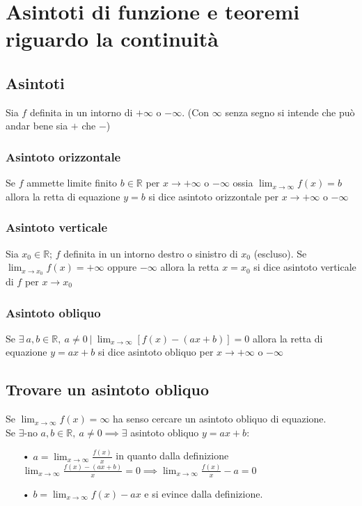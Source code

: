 \chapter{Asintoti di funzione e teoremi riguardo la continuità}
\section{Asintoti}
Sia $f$ definita in un intorno di $+\infty$ o $-\infty$. (Con $\infty$ senza segno si intende che può andar bene sia $+$ che $-$)
\subsection{Asintoto orizzontale}
Se $f$ ammette limite finito $b \in \mathbb{R}$ per $x \to +\infty$ o $-\infty$ ossia $\displaystyle \lim_{x \to \infty}f(x) = b$ allora la retta di equazione $y = b$ si dice asintoto orizzontale per $x \to +\infty$ o $-\infty$
\subsection{Asintoto verticale}
Sia $x_0 \in \mathbb{R}$; $f$ definita in un intorno destro o sinistro di $x_0$ (escluso). Se $\displaystyle \lim_{x \to x_0}f(x) = +\infty$ oppure $-\infty$ allora la retta $x = x_0$ si dice asintoto verticale di $f$ per $x \to x_0$
\subsection{Asintoto obliquo}
Se $\exists\ a,b \in \mathbb{R},\ a \neq 0\ |\ \displaystyle \lim_{x \to \infty}[f(x) - (ax + b)] = 0$ allora la retta di equazione $y = ax + b$ si dice asintoto obliquo per $x \to +\infty$ o $-\infty$

\section{Trovare un asintoto obliquo}
Se $\displaystyle \lim_{x \to \infty}f(x) = \infty$ ha senso cercare un asintoto obliquo di equazione.\\
Se $\exists \text{-no } a,b \in \mathbb{R},\ a \neq 0 \implies \exists$ asintoto obliquo $y = ax + b$:
\begin{enumerate}
\item[•] $a = \displaystyle \lim_{x \to \infty} \frac{f(x)}{x}$ in quanto dalla definizione $\displaystyle \lim_{x \to \infty} \frac{f(x) - (ax + b)}{x} = 0 \implies \displaystyle \lim_{x \to \infty}\frac{f(x)}{x} - a = 0$
\item[•] $b  =\displaystyle \lim_{x \to \infty}f(x) - ax$ e si evince dalla definizione.
\end{enumerate}

